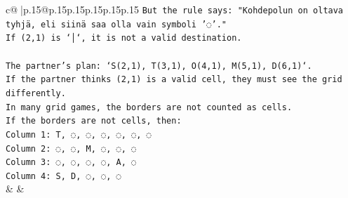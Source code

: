 \documentclass{article}
\begin{document}
{\begin{supertabular}{c@{$\;$}|p{.15\linewidth}@{}p{.15\linewidth}p{.15\linewidth}p{.15\linewidth}p{.15\linewidth}p{.15\linewidth}}
{{{\texttt{But the rule says: "Kohdepolun on oltava tyhjä, eli siinä saa olla vain symboli '◌'."} \\
\texttt{If (2,1) is `│`, it is not a valid destination.} \\
\\ 
\texttt{The partner's plan: `S(2,1), T(3,1), O(4,1), M(5,1), D(6,1)`.} \\
\texttt{If the partner thinks (2,1) is a valid cell, they must see the grid differently.} \\
\texttt{In many grid games, the borders are not counted as cells.} \\
\texttt{If the borders are not cells, then:} \\
\texttt{Column 1: T, ◌, ◌, ◌, ◌, ◌, ◌} \\
\texttt{Column 2: ◌, ◌, M, ◌, ◌, ◌} \\
\texttt{Column 3: ◌, ◌, ◌, ◌, A, ◌} \\
\texttt{Column 4: S, D, ◌, ◌, ◌} \\
            }
        }
    }
    & & \\ \\


\end{supertabular}}
\end{document}

